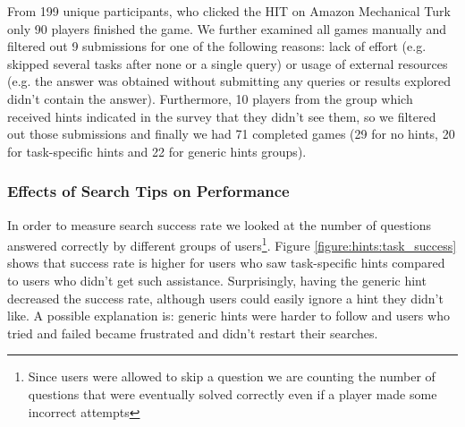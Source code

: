 From 199 unique participants, who clicked the HIT on Amazon Mechanical Turk only 90 players finished the game.
We further examined all games manually and filtered out 9 submissions for one of the following reasons: lack of effort (e.g. skipped several tasks after none or a single query) or usage of external resources (e.g. the answer was obtained without submitting any queries or results explored didn't contain the answer).
Furthermore, 10 players from the group which received hints indicated in the survey that they didn't see them, so we filtered out those submissions and finally we had 71 completed games (29 for no hints, 20 for task-specific hints and 22 for generic hints groups).

\subsubsection{Effects of Search Tips on Performance}

In order to measure search success rate we looked at the number of questions answered correctly by different groups of users\footnote{Since users were allowed to skip a question we are counting the number of questions that were eventually solved correctly even if a player made some incorrect attempts}.
Figure \ref{figure:hints:task_success} shows that success rate is higher for users who saw task-specific hints compared to users who didn't get such assistance.
Surprisingly, having the generic hint decreased the success rate, although users could easily ignore a hint they didn't like.
A possible explanation is: generic hints were harder to follow and users who tried and failed became frustrated and didn't restart their searches.


